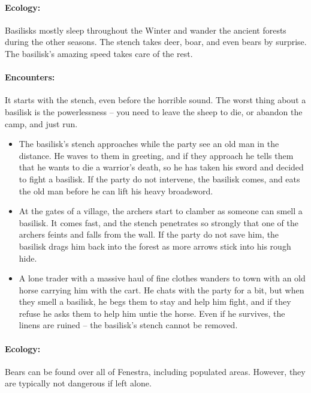 \begin{multicols}{2}
\paragraph{Ecology:} Basilisks mostly sleep throughout the Winter and wander the ancient forests during the other seasons.
The stench takes deer, boar, and even bears by surprise.
The basilisk's amazing speed takes care of the rest.

\paragraph{Encounters:} It starts with the stench, even before the horrible sound.
The worst thing about a basilisk is the powerlessness -- you need to leave the sheep to die, or abandon the camp, and just run.

\begin{itemize}

	\item{The basilisk's stench approaches while the party see an old man in the distance.
	He waves to them in greeting, and if they approach he tells them that he wants to die a warrior's death, so he has taken his sword and decided to fight a basilisk.
	If the party do not intervene, the basilisk comes, and eats the old man before he can lift his heavy broadsword.}
	\item{At the gates of a village, the archers start to clamber as someone can smell a basilisk.
	It comes fast, and the stench penetrates so strongly that one of the archers feints and falls from the wall.
	If the party do not save him, the basilisk drags him back into the forest as more arrows stick into his rough hide.}
	\item{A lone trader with a massive haul of fine clothes wanders to town with an old horse carrying him with the cart.
	He chats with the party for a bit, but when they smell a basilisk, he begs them to stay and help him fight, and if they refuse he asks them to help him untie the horse.
	Even if he survives, the linens are ruined -- the basilisk's stench cannot be removed.}

\end{itemize}

\label{bear}

\paragraph{Ecology:} Bears can be found over all of Fenestra, including populated areas.  However, they are typically not dangerous if left alone.


\end{multicols}
